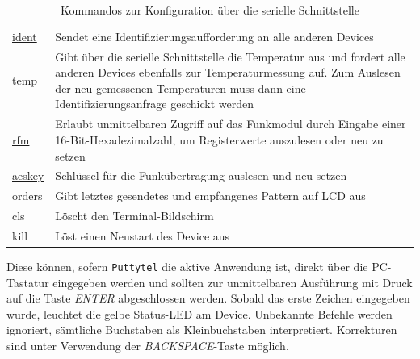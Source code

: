 \documentclass[paper=a4, parskip, numbers=noenddot, toc=listof, headsepline]{scrbook}
\begin{document}
\begin{table}[bt]
\begin{center}
\begin{tabularx}{.9\textwidth}{lX}
						  \hyperref[sec:manuellessenden]{ident} & Sendet eine Identifizierungsaufforderung an alle anderen Devices                                                                                                                                                                   \\
						  \hyperref[sec:manuellessenden]{temp}  & Gibt über die serielle Schnittstelle die Temperatur aus und fordert alle anderen Devices ebenfalls zur Temperaturmessung auf. Zum Auslesen der neu gemessenen Temperaturen muss dann eine Identifizierungsanfrage geschickt werden \\ \hline
						  \hyperref[sec:rfmzugriff]{rfm}        & Erlaubt unmittelbaren Zugriff auf das Funkmodul durch Eingabe einer 16-Bit-Hexadezimalzahl, um Registerwerte auszulesen oder neu zu setzen                                                                                         \\
						  \hyperref[sec:encryption]{aeskey}     & Schlüssel für die Funkübertragung auslesen und neu setzen                                                                                                                                                                          \\ \hline
						  orders                                & Gibt letztes gesendetes und empfangenes Pattern auf LCD aus                                                                                                                                                                        \\ \hline
						  cls                                   & Löscht den Terminal-Bildschirm                                                                                                                                                                                                     \\
						  kill                                  & Löst einen Neustart des Device aus                                                                                                                                                                                                 \\ \hline\hline
					  \end{tabularx}
					  \caption{Kommandos zur Konfiguration über die serielle Schnittstelle}
					  \label{tab:commands}
				  \end{center}
			  \end{table}

			  Diese können, sofern \texttt{Puttytel} die aktive Anwendung ist, direkt über die PC-Tastatur eingegeben werden und sollten zur unmittelbaren Ausführung mit Druck auf die Taste \emph{ENTER} abgeschlossen werden. Sobald das erste Zeichen eingegeben wurde, leuchtet die gelbe Status-LED am Device. Unbekannte Befehle werden ignoriert, sämtliche Buchstaben als Kleinbuchstaben interpretiert. Korrekturen sind unter Verwendung der \emph{BACKSPACE}-Taste möglich.
\end{document}
